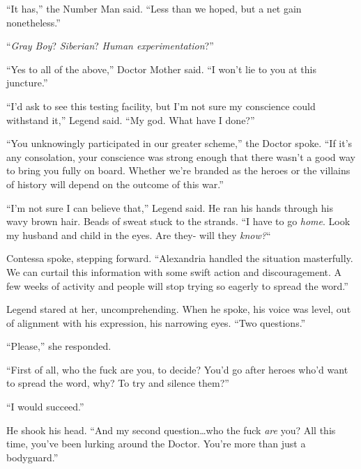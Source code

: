 ``It has,'' the Number Man said.  ``Less than we hoped, but a net gain nonetheless.''



``\emph{Gray Boy}?  \emph{Siberian}?  \emph{Human experimentation}?''



``Yes to all of the above,'' Doctor Mother said.  ``I won't lie to you at this juncture.''



``I'd ask to see this testing facility, but I'm not sure my conscience could withstand it,'' Legend said.  ``My god.  What have I done?''



``You unknowingly participated in our greater scheme,'' the Doctor spoke.  ``If it's any consolation, your conscience was strong enough that there wasn't a good way to bring you fully on board.  Whether we're branded as the heroes or the villains of history will depend on the outcome of this war.''



``I'm not sure I can believe that,'' Legend said.  He ran his hands through his wavy brown hair.  Beads of sweat stuck to the strands.  ``I have to go \emph{home}.  Look my husband and child in the eyes.  Are they- will they \emph{know?}``



Contessa spoke, stepping forward.  ``Alexandria handled the situation masterfully.  We can curtail this information with some swift action and discouragement.  A few weeks of activity and people will stop trying so eagerly to spread the word.''



Legend stared at her, uncomprehending.  When he spoke, his voice was level, out of alignment with his expression, his narrowing eyes.  ``Two questions.''



``Please,'' she responded.



``First of all, who the fuck are you, to decide?  You'd go after heroes who'd want to spread the word, why?  To try and silence them?''



``I would succeed.''



He shook his head.  ``And my second question\ldots who the fuck \emph{are} you?  All this time, you've been lurking around the Doctor.  You're more than just a bodyguard.''



